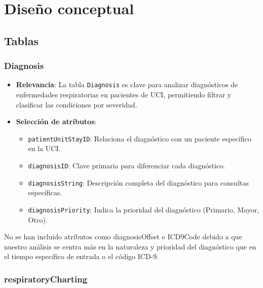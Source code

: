 \documentclass[12pt, a4paper, twoside]{article}
\begin{document}
	\section{Diseño conceptual}
	
	\subsection{Tablas}
	
	\subsubsection{Diagnosis} 
	
	\begin{itemize}
		\item \textbf{Relevancia}: La tabla \texttt{Diagnosis} es clave para analizar diagnósticos de enfermedades respiratorias en pacientes de UCI, permitiendo filtrar y clasificar las condiciones por severidad.
		
		\item \textbf{Selección de atributos}:
		\begin{itemize}
			\item \texttt{patientUnitStayID}: Relaciona el diagnóstico con un paciente específico en la UCI.
			\item \texttt{diagnosisID}: Clave primaria para diferenciar cada diagnóstico.
			\item \texttt{diagnosisString}: Descripción completa del diagnóstico para consultas específicas.
			\item \texttt{diagnosisPriority}: Indica la prioridad del diagnóstico (Primario, Mayor, Otro).
		\end{itemize}
	\end{itemize}
	
	No se han incluido atributos como diagnosisOffset e ICD9Code debido a que nuestro análisis se centra más en la naturaleza y prioridad del diagnóstico que en el tiempo específico de entrada o el código ICD-9. \cite{eICU2024}
	
	\subsubsection{respiratoryCharting}
	
\end{document}
